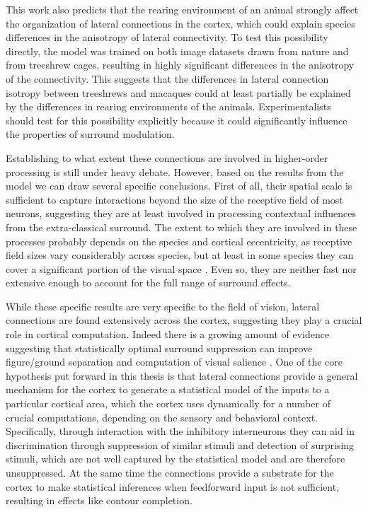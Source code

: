 This work also predicts that the rearing environment of an animal
strongly affect the organization of lateral connections in the cortex,
which could explain species differences in the anisotropy of lateral
connectivity. To test this possibility directly, the model was trained
on both image datasets drawn from nature and from treeshrew cages,
resulting in highly significant differences in the anisotropy of the
connectivity. This suggests that the differences in lateral connection
isotropy between treeshrews \citep{Bosking1997} and macaques
\citep{Angelucci2002} could at least partially be explained by the
differences in rearing environments of the animals. Experimentalists
should test for this possibility explicitly because it could
significantly influence the properties of surround modulation.

Establishing to what extent these connections are involved in
higher-order processing is still under heavy debate. However, based on
the results from the model we can draw several specific
conclusions. First of all, their spatial scale is sufficient to
capture interactions beyond the size of the receptive field of most
neurons, suggesting they are at least involved in processing
contextual influences from the extra-classical surround. The extent to
which they are involved in these processes probably depends on the
species and cortical eccentricity, as receptive field sizes vary
considerably across species, but at least in some species they can
cover a significant portion of the visual space
\citep{Bosking1997}. Even so, they are neither fast nor extensive
enough to account for the full range of surround effects.

While these specific results are very specific to the field of vision,
lateral connections are found extensively across the cortex,
suggesting they play a crucial role in cortical computation. Indeed
there is a growing amount of evidence suggesting that statistically
optimal surround suppression can improve figure/ground separation and
computation of visual salience \citep{Coen-Cagli2013, Coen2015}. One
of the core hypothesis put forward in this thesis is that lateral
connections provide a general mechanism for the cortex to generate a
statistical model of the inputs to a particular cortical area, which
the cortex uses dynamically for a number of crucial computations,
depending on the sensory and behavioral context. Specifically, through
interaction with the inhibitory interneurons they can aid in
discrimination through suppression of similar stimuli and detection of
surprising stimuli, which are not well captured by the statistical
model and are therefore unsuppressed. At the same time the connections
provide a substrate for the cortex to make statistical inferences when
feedforward input is not sufficient, resulting in effects like contour
completion.

